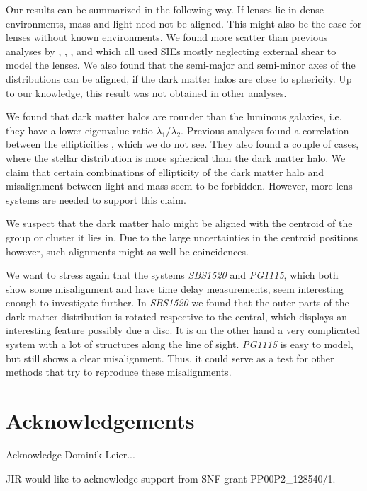 \documentclass[useAMS,usenatbib]{mn2e}
\begin{document}
Our results can be summarized in the following way. If lenses lie in dense environments, mass and light need not be aligned. This might also be the case for lenses without known environments. We found more scatter than previous analyses by \cite{1997ApJ...482..604K}, \cite{2006ApJ...649..599K}, \cite{2009ApJ...690..670T}, and \cite{2012ApJ...761..170G} which all used SIEs mostly neglecting external shear to model the lenses. We also found that the semi-major and semi-minor axes of the distributions can be aligned, if the dark matter halos are close to sphericity. Up to our knowledge, this result was not obtained in other analyses.

We found that dark matter halos are rounder than the luminous galaxies, i.e. they have a lower eigenvalue ratio $\lambda_{1}/\lambda_{2}$. Previous analyses found a correlation between the ellipticities \citep{2009ApJ...690..670T,2012ApJ...761..170G}, which we do not see. They also found a couple of cases, where the stellar distribution is more spherical than the dark matter halo. We claim that certain combinations of ellipticity of the dark matter halo and misalignment between light and mass seem to be forbidden. However, more lens systems are needed to support this claim.

We suspect that the dark matter halo might be aligned with the centroid of the group or cluster it lies in. Due to the large uncertainties in the centroid positions however, such alignments might as well be coincidences.

We want to stress again that the systems \textit{SBS1520} and \textit{PG1115}, which both show some misalignment and have time delay measurements, seem interesting enough to investigate further. In \textit{SBS1520} we found that the outer parts of the dark matter distribution is rotated respective to the central, which displays an interesting feature possibly due a disc. It is on the other hand a very complicated system with a lot of structures along the line of sight. \textit{PG1115} is easy to model, but still shows a clear misalignment. Thus, it could serve as a test for other methods that try to reproduce these misalignments.


\section{Acknowledgements}\label{sec:acknowledgements}
Acknowledge Dominik Leier...

JIR would like to acknowledge support from SNF grant PP00P2\_128540/1.
\end{document}

